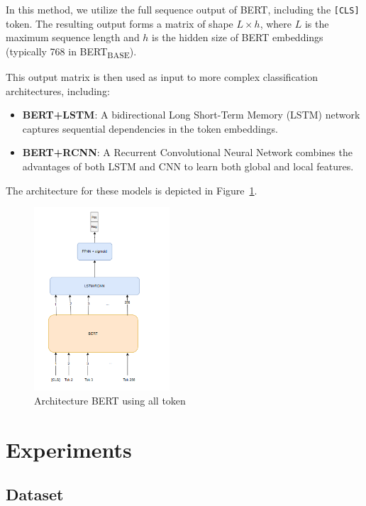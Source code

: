 \documentclass[11pt]{article}
\begin{document}
In this method, we utilize the full sequence output of BERT, including the \texttt{[CLS]} token. The resulting output forms a matrix of shape $L \times h$, where $L$ is the maximum sequence length and $h$ is the hidden size of BERT embeddings (typically 768 in BERT\textsubscript{BASE}).

This output matrix is then used as input to more complex classification architectures, including:
\begin{itemize}
    \item \textbf{BERT+LSTM}: A bidirectional Long Short-Term Memory (LSTM) network captures sequential dependencies in the token embeddings.
    \item \textbf{BERT+RCNN}: A Recurrent Convolutional Neural Network combines the advantages of both LSTM and CNN to learn both global and local features.
\end{itemize}

The architecture for these models is depicted in Figure~\ref{fig:bert_rcnn_lstm_architecture}.

\begin{figure}[h]
\centering
\includegraphics[width=0.45\textwidth]{img/BERTCombine.png}
\caption{Architecture BERT using all token}
\label{fig:bert_rcnn_lstm_architecture}
\end{figure}
\FloatBarrier

\section{Experiments}
\label{sec:experiments}
\subsection{Dataset}
\end{document}
